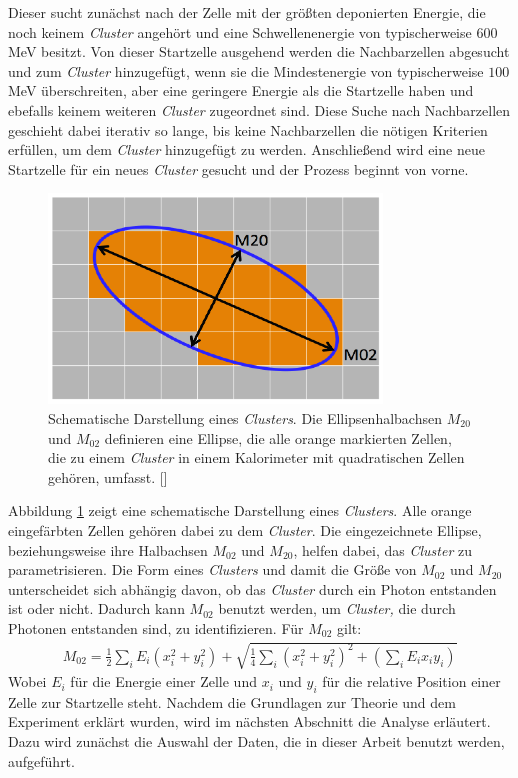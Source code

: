 Dieser sucht zunächst nach der Zelle mit der größten deponierten Energie, die noch keinem \textit{Cluster} angehört und eine Schwellenenergie von typischerweise $600$ MeV besitzt.
Von dieser Startzelle ausgehend werden die Nachbarzellen abgesucht und zum \textit{Cluster} hinzugefügt, wenn sie die Mindestenergie von typischerweise $100$ MeV überschreiten, aber eine geringere Energie als die Startzelle haben und ebefalls keinem weiteren \textit{Cluster} zugeordnet sind.
Diese Suche nach Nachbarzellen geschieht dabei iterativ so lange, bis keine Nachbarzellen die nötigen Kriterien erfüllen, um dem \textit{Cluster} hinzugefügt zu werden.
Anschließend wird eine neue Startzelle für ein neues \textit{Cluster} gesucht und der Prozess beginnt von vorne.
\begin{figure}[t!]
\centering
\includegraphics[width=.35\linewidth]{m02&m20.png}
\caption{Schematische Darstellung eines \textit{Clusters}. Die Ellipsenhalbachsen $M_{20}$ und $M_{02}$ definieren eine Ellipse, die alle orange markierten Zellen, die zu einem \textit{Cluster} in einem Kalorimeter mit quadratischen Zellen gehören, umfasst.
[\cite{thesis:Adrian}]}
\label{fig:$M_{20}$}
\end{figure}
Abbildung \ref{fig:$M_{20}$} zeigt eine schematische Darstellung eines \textit{Clusters}.
Alle orange eingefärbten Zellen gehören dabei zu dem \textit{Cluster}.
Die eingezeichnete Ellipse, beziehungsweise ihre Halbachsen $M_{02}$ und $M_{20}$, helfen dabei, das \textit{Cluster} zu parametrisieren.
Die Form eines \textit{Clusters} und damit die Größe von $M_{02}$ und $M_{20}$ unterscheidet sich abhängig davon, ob das \textit{Cluster} durch ein Photon entstanden ist oder nicht.
Dadurch kann $M_{02}$ benutzt werden, um \textit{Cluster,} die durch Photonen entstanden sind, zu identifizieren.
Für $M_{02}$ gilt:
\begin{align} 
M_{02} = \frac{1}{2}\sum_{i}E_{i}(x_{i}^{2}+y_{i}^{2})+\sqrt{\frac{1}{4}\sum_{i}\left(x_{i}^{2}+y_{i}^{2}\right)^{2}+\left(\sum_{i}E_{i}x_{i}y_{i}\right)}
\end{align}
Wobei $E_{i}$ für die Energie einer Zelle und $x_{i}$ und $y_{i}$ für die relative Position einer Zelle zur Startzelle steht.
\newline
Nachdem die Grundlagen zur Theorie und dem Experiment erklärt wurden, wird im nächsten Abschnitt die Analyse erläutert.
Dazu wird zunächst die Auswahl der Daten, die in dieser Arbeit benutzt werden, aufgeführt.